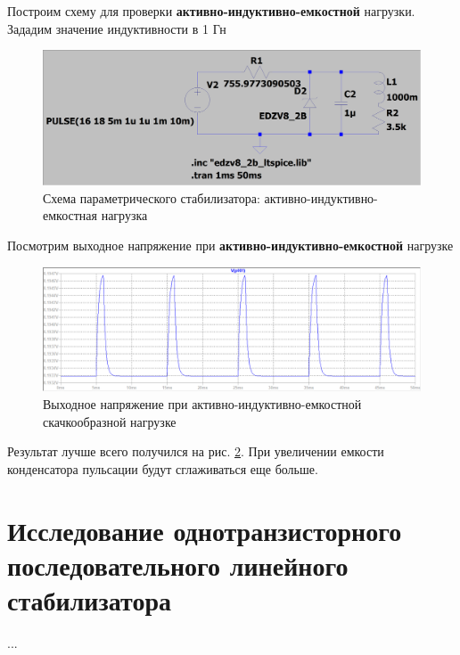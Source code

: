 \documentclass[a4paper, 12pt]{article}
\begin{document}
    \noindent Построим схему для проверки \textbf{активно-индуктивно-емкостной} нагрузки. Зададим
    значение индуктивности в 1 Гн
    \begin{figure}[H]
        \centering
        \includegraphics[scale=0.22]{1task_scheme_ALC.png}
        \captionsetup{skip=0pt}
        \caption{Схема параметрического стабилизатора: активно-индуктивно-емкостная нагрузка}
        \label{fig:1task_scheme_ALC}
    \end{figure}
    \noindent Посмотрим выходное напряжение при \textbf{активно-индуктивно-емкостной} нагрузке
    \begin{figure}[H]
        \centering
        \includegraphics[scale=0.46]{1task_rect_ALC.png}
        \captionsetup{skip=0pt}
        \caption{Выходное напряжение при активно-индуктивно-емкостной скачкообразной нагрузке}
        \label{fig:1task_rect_ALC}
    \end{figure}
    \noindent Результат лучше всего получился на рис. \ref{fig:1task_rect_ALC}. При увеличении
    емкости конденсатора пульсации будут сглаживаться еще больше.


    \section{Исследование однотранзисторного последовательного линейного стабилизатора}
    ...
\end{document}
